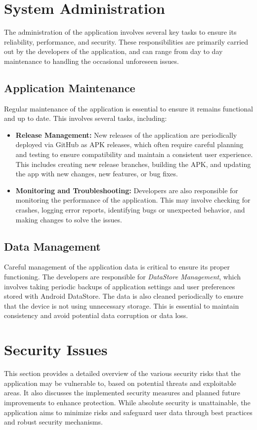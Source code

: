 \section{System Administration}

The administration of the application involves several key tasks to ensure its reliability, performance, and security. These responsibilities are primarily carried out by the developers of the application, and can range from day to day maintenance to handling the occasional unforeseen issues.

\subsection{Application Maintenance}

Regular maintenance of the application is essential to ensure it remains functional and up to date. This involves several tasks, including:

\begin{itemize}
    \item \textbf{Release Management:} New releases of the application are periodically deployed via GitHub as APK releases, which often require careful planning and testing to ensure compatibility and maintain a consistent user experience. This includes creating new release branches, building the APK, and updating the app with new changes, new features, or bug fixes.
    \item \textbf{Monitoring and Troubleshooting:} Developers are also responsible for monitoring the performance of the application. This may involve checking for crashes, logging error reports, identifying bugs or unexpected behavior, and making changes to solve the issues.
\end{itemize}

\subsection{Data Management}

Careful management of the application data is critical to ensure its proper functioning.  The developers are responsible for \textit{DataStore Management}, which involves taking periodic backups of application settings and user preferences stored with Android DataStore. The data is also cleaned periodically to ensure that the device is not using unnecessary storage. This is essential to maintain consistency and avoid potential data corruption or data loss.

\section{Security Issues}
This section provides a detailed overview of the various security risks that the application may be vulnerable to, based on potential threats and exploitable areas. It also discusses the implemented security measures and planned future improvements to enhance protection. While absolute security is unattainable, the application aims to minimize risks and safeguard user data through best practices and robust security mechanisms.

